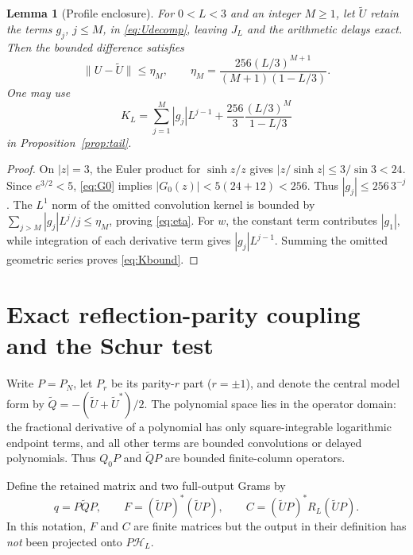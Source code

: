 \documentclass[11pt]{article}
\numberwithin{equation}{section}
\newtheorem{lemma}[theorem]{Lemma}
\theoremstyle{definition}
\theoremstyle{remark}
\newcommand{\HH}{\mathcal H}
\newcommand{\norm}[1]{\lVert#1\rVert}
\begin{document}
\begin{lemma}[Profile enclosure]\label{lem:profile}
For $0<L<3$ and an integer $M\ge1$, let $\widetilde U$ retain the terms
$g_j$, $j\le M$, in \eqref{eq:Udecomp}, leaving $J_L$ and the arithmetic
delays exact. Then the bounded difference satisfies
\begin{equation}\label{eq:eta}
 \norm{U-\widetilde U}\le\eta_M,
 \qquad \eta_M=\frac{256(L/3)^{M+1}}{(M+1)(1-L/3)}.
\end{equation}
One may use
\begin{equation}\label{eq:Kbound}
 K_L=\sum_{j=1}^M|g_j|L^{j-1}
 +\frac{256}{3}\frac{(L/3)^M}{1-L/3}
\end{equation}
in Proposition~\ref{prop:tail}.
\end{lemma}
\begin{proof}
On $|z|=3$, the Euler product for $\sinh z/z$
\cite[\S4.36]{DLMF} gives $|z/\sinh z|\le3/\sin3<24$.
Since $e^{3/2}<5$, \eqref{eq:G0} implies
$|G_0(z)|<5(24+12)<256$. Thus $|g_j|\le256\,3^{-j}$.
The $L^1$ norm of the omitted convolution kernel is bounded by
$\sum_{j>M}|g_j|L^j/j\le\eta_M$, proving \eqref{eq:eta}.
For $w$, the constant term contributes $|g_1|$, while integration of each
derivative term gives $|g_j|L^{j-1}$. Summing the omitted geometric series
proves \eqref{eq:Kbound}.
\end{proof}

\section{Exact reflection-parity coupling and the Schur test}\label{sec:schur}

Write $P=P_N$, let $P_r$ be its parity-$r$ part ($r=\pm1$), and denote
the central model form by $\widetilde Q=-(\widetilde U+\widetilde U^*)/2$.
The polynomial space lies in the operator domain: the fractional derivative
of a polynomial has only square-integrable logarithmic endpoint terms,
and all other terms are bounded convolutions or delayed polynomials.
Thus $Q_0P$ and $\widetilde QP$ are bounded finite-column operators.

Define the retained matrix and two full-output Grams by
\begin{equation}\label{eq:grams}
 q=P\widetilde QP,\qquad
 F=(\widetilde UP)^*(\widetilde UP),\qquad
 C=(\widetilde UP)^*R_L(\widetilde UP).
\end{equation}
In this notation, $F$ and $C$ are finite matrices but the output in their
definition has \emph{not} been projected onto $P\HH_L$.
\end{document}

